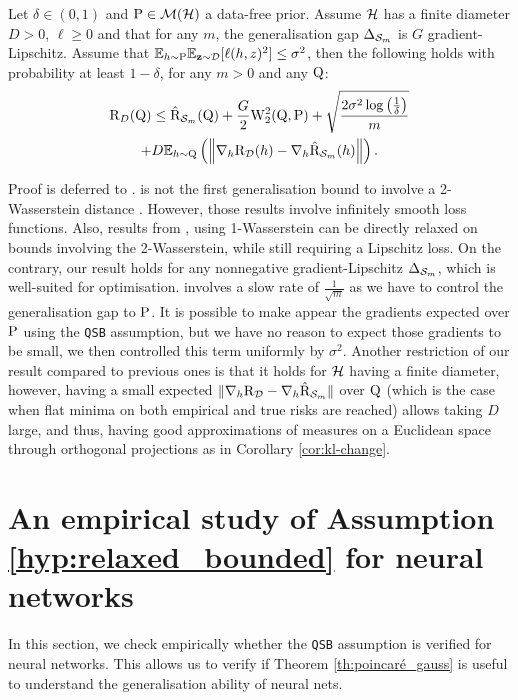\begin{theorem}
\label{th:wpb-grad}
Let $\delta\in(0,1)$ and $\P\in\Mcal(\Hcal)$ a data-free prior.
Assume $\Hcal$ has a finite diameter $D>0$, $\ell\geq 0$ and that for any $m$, the generalisation gap $\Delta_{\S_m}$ is $G$ gradient-Lipschitz.
Assume that $\mathbb{E}_{h\sim\P}\Ebb_{\z\sim\D}[\ell(h,z)^2] \leq \sigma^2$, then the following holds with probability at least $1-\delta$, for any $m>0$ and any $\Q$:
\begin{multline*}
    \Risk_D(\Q) \leq \hat{\Risk}_{\S_m}(\Q) + \frac{G}{2} \W_2^2(\Q,\P) + \sqrt{\frac{2\sigma^2\log\LP \frac{1}{\delta} \RP}{m}} \\
    + D \mathbb{E}_{h\sim \Q}\LP \left\| \nabla_h \Risk_\D(h) - \nabla_h \hat{\Risk}_{\S_m}(h) \right\| \RP.
\end{multline*}
\end{theorem}
Proof is deferred to .  
 is not the first generalisation bound to involve a 2-Wasserstein distance \citep{lugosi2022generalization,lugosi2023onlinetopac}.
However, those results involve infinitely smooth loss functions.
Also, results from \citet{amit2022integral},  using 1-Wasserstein can be directly relaxed on bounds involving the 2-Wasserstein, while still requiring a Lipschitz loss.
On the contrary, our result holds for any nonnegative gradient-Lipschitz $\Delta_{\S_m}$, which is well-suited for optimisation.
 involves a slow rate of $\frac{1}{\sqrt{m}}$ as we have to control the generalisation gap \wrt to $\P$.
It is possible to make appear the gradients expected over $\P$ using the \texttt{QSB} assumption, but we have no reason to expect those gradients to be small, we then controlled this term uniformly by $\sigma^2$.
Another restriction of our result compared to previous ones is that it holds for $\H$ having a finite diameter, however, having a small expected $\| \nabla_h \Risk_\D-\nabla_h\hat{\Risk}_{\S_m}\|$ over $\Q$ (which is the case when flat minima on both empirical and true risks are reached) allows taking $D$ large, and thus, having good approximations of measures on a Euclidean space through orthogonal projections as in Corollary \ref{cor:kl-change}.

\section{An empirical study of Assumption \ref{hyp:relaxed_bounded} for neural networks}
\label{sec: expes}
In this section, we check empirically whether the \texttt{QSB} assumption is verified for neural networks.
This allows us to verify if Theorem \ref{th:poincaré_gauss} is useful to understand the generalisation ability of neural nets.\\

